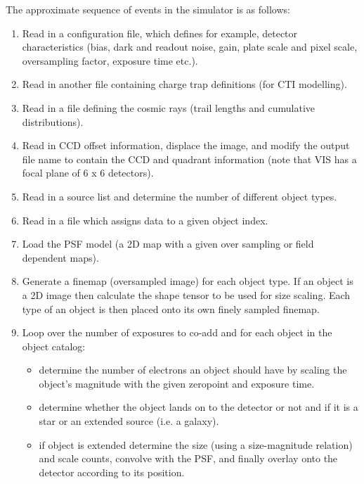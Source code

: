 \documentclass[a4paper,11pt,english]{sphinxmanual}
\begin{document}
The approximate sequence of events in the simulator is as follows:
\begin{enumerate}
\item {} 
Read in a configuration file, which defines for example,
detector characteristics (bias, dark and readout noise, gain,
plate scale and pixel scale, oversampling factor, exposure time etc.).

\item {} 
Read in another file containing charge trap definitions (for CTI modelling).

\item {} 
Read in a file defining the cosmic rays (trail lengths and cumulative distributions).

\item {} 
Read in CCD offset information, displace the image, and modify
the output file name to contain the CCD and quadrant information
(note that VIS has a focal plane of 6 x 6 detectors).

\item {} 
Read in a source list and determine the number of different object types.

\item {} 
Read in a file which assigns data to a given object index.

\item {} 
Load the PSF model (a 2D map with a given over sampling or field dependent maps).

\item {} 
Generate a finemap (oversampled image) for each object type. If an object
is a 2D image then calculate the shape tensor to be used for size scaling.
Each type of an object is then placed onto its own finely sampled finemap.

\item {} 
Loop over the number of exposures to co-add and for each object in the object catalog:
\begin{itemize}
\item {} 
determine the number of electrons an object should have by scaling the object's magnitude
with the given zeropoint and exposure time.

\item {} 
determine whether the object lands on to the detector or not and if it is
a star or an extended source (i.e. a galaxy).

\item {} 
if object is extended determine the size (using a size-magnitude relation) and scale counts,
convolve with the PSF, and finally overlay onto the detector according to its position.


\end{itemize}
\end{enumerate}
\end{document}
